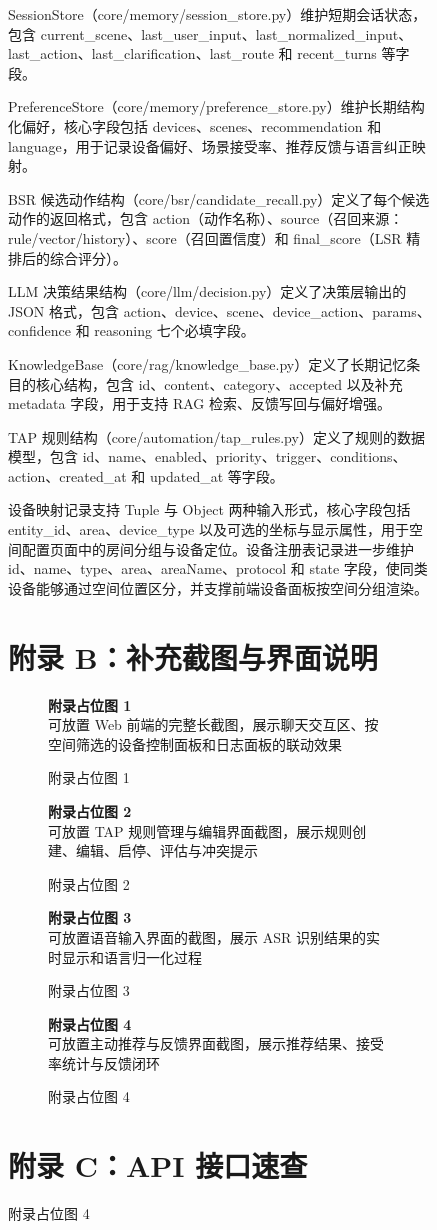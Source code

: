 \documentclass[12pt,a4paper,oneside]{ctexrep}
\newcommand{\figureplaceholder}[2]{
    \begin{figure}[H]
        \centering
        \begin{placeholderbox}[图占位符]
            \centering
            \vspace{2.6cm}
            {\Large \textbf{#1}}\\[0.6em]
            {\small #2}
            \vspace{2.6cm}
        \end{placeholderbox}
        \caption{#1}
    \end{figure}
}
\begin{document}
\begin{figure}[H]
SessionStore（core/memory/session\_store.py）维护短期会话状态，包含 current\_scene、last\_user\_input、last\_normalized\_input、last\_action、last\_clarification、last\_route 和 recent\_turns 等字段。

PreferenceStore（core/memory/preference\_store.py）维护长期结构化偏好，核心字段包括 devices、scenes、recommendation 和 language，用于记录设备偏好、场景接受率、推荐反馈与语言纠正映射。

BSR 候选动作结构（core/bsr/candidate\_recall.py）定义了每个候选动作的返回格式，包含 action（动作名称）、source（召回来源：rule/vector/history）、score（召回置信度）和 final\_score（LSR 精排后的综合评分）。

LLM 决策结果结构（core/llm/decision.py）定义了决策层输出的 JSON 格式，包含 action、device、scene、device\_action、params、confidence 和 reasoning 七个必填字段。

KnowledgeBase（core/rag/knowledge\_base.py）定义了长期记忆条目的核心结构，包含 id、content、category、accepted 以及补充 metadata 字段，用于支持 RAG 检索、反馈写回与偏好增强。

TAP 规则结构（core/automation/tap\_rules.py）定义了规则的数据模型，包含 id、name、enabled、priority、trigger、conditions、action、created\_at 和 updated\_at 等字段。

设备映射记录支持 Tuple 与 Object 两种输入形式，核心字段包括 entity\_id、area、device\_type 以及可选的坐标与显示属性，用于空间配置页面中的房间分组与设备定位。设备注册表记录进一步维护 id、name、type、area、areaName、protocol 和 state 字段，使同类设备能够通过空间位置区分，并支撑前端设备面板按空间分组渲染。

\section*{附录 B：补充截图与界面说明}

\figureplaceholder{附录占位图 1}{可放置 Web 前端的完整长截图，展示聊天交互区、按空间筛选的设备控制面板和日志面板的联动效果}
\figureplaceholder{附录占位图 2}{可放置 TAP 规则管理与编辑界面截图，展示规则创建、编辑、启停、评估与冲突提示}
\figureplaceholder{附录占位图 3}{可放置语音输入界面的截图，展示 ASR 识别结果的实时显示和语言归一化过程}
\figureplaceholder{附录占位图 4}{可放置主动推荐与反馈界面截图，展示推荐结果、接受率统计与反馈闭环}

\section*{附录 C：API 接口速查}


\end{figure}
\end{document}
